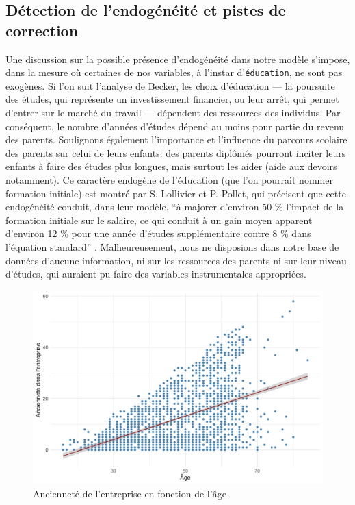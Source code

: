 \documentclass[a4paper, french, 11 pt]{article}\usepackage[]{graphicx}\usepackage[]{xcolor}
\begin{document}
\subsection{Détection de l’endogénéité et pistes de correction}

 Une discussion sur la possible présence d’endogénéité dans notre modèle s’impose, dans la mesure où certaines de nos variables, à l'instar d'\texttt{éducation}, ne sont pas exogènes. Si l'on suit l'analyse de Becker, les choix d'éducation --- la poursuite des études, qui représente un investissement financier, ou leur arrêt, qui permet d'entrer sur le marché du travail --- dépendent des ressources des individus. Par conséquent, le nombre d'années d'études dépend au moins pour partie du revenu des parents. Soulignons également l’importance et l’influence du parcours scolaire des parents sur celui de leurs enfants: des parents diplômés pourront inciter leurs enfants à faire des études plus longues, mais surtout les aider (aide aux devoirs notamment). Ce caractère endogène de l'éducation (que l'on pourrait nommer formation initiale) est montré par S. Lollivier et P. Pollet, qui précisent que cette endogénéité conduit, dans leur modèle, \enquote{à majorer d’environ 50 \% l’impact de la formation initiale sur le salaire, ce qui conduit à un gain moyen apparent d’environ 12 \% pour une année d’études supplémentaire contre 8 \% dans l’équation standard} \parencite{lollivier2003}. Malheureusement, nous ne disposions dans notre base de données d'aucune information, ni sur les ressources des parents ni sur leur niveau d'études, qui auraient pu faire des variables instrumentales appropriées. 
 
 \begin{figure}[h]
\center
\includegraphics[width=0.7\linewidth]{figure/exp_age.pdf}
\caption{Ancienneté de l'entreprise en fonction de l'âge\label{fig:exp_age}}
\end{figure}
 
\end{document}
